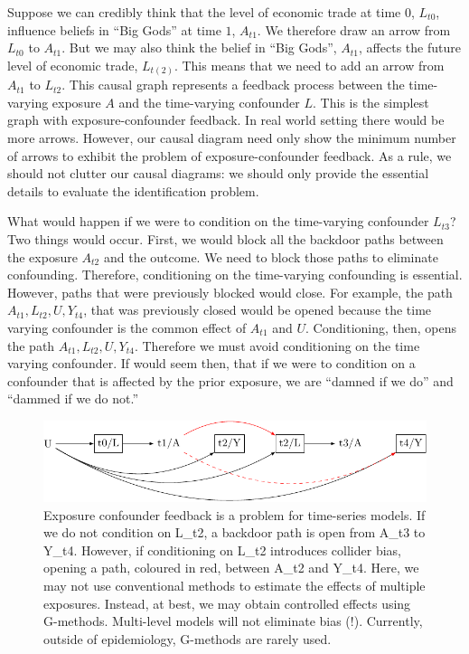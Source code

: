 \documentclass[
  singlecolumn]{report}
\begin{document}
Suppose we can credibly think that the level of economic trade at time
\(0\), \(L_{t0}\), influence beliefs in ``Big Gods'' at time \(1\),
\(A_{t1}\). We therefore draw an arrow from \(L_{t0}\) to \(A_{t1}\).
But we may also think the belief in ``Big Gods'', \(A_{t1}\), affects
the future level of economic trade, \(L_{t(2)}\). This means that we
need to add an arrow from \(A_{t1}\) to \(L_{t2}\). This causal graph
represents a feedback process between the time-varying exposure \(A\)
and the time-varying confounder \(L\). This is the simplest graph with
exposure-confounder feedback. In real world setting there would be more
arrows. However, our causal diagram need only show the minimum number of
arrows to exhibit the problem of exposure-confounder feedback. As a
rule, we should not clutter our causal diagrams: we should only provide
the essential details to evaluate the identification problem.

What would happen if we were to condition on the time-varying confounder
\(L_{t3}\)? Two things would occur. First, we would block all the
backdoor paths between the exposure \(A_{t2}\) and the outcome. We need
to block those paths to eliminate confounding. Therefore, conditioning
on the time-varying confounding is essential. However, paths that were
previously blocked would close. For example, the path
\(A_{t1}, L_{t2}, U, Y_{t4}\), that was previously closed would be
opened because the time varying confounder is the common effect of
\(A_{t1}\) and \(U\). Conditioning, then, opens the path
\(A_{t1}, L_{t2}, U, Y_{t4}\). Therefore we must avoid conditioning on
the time varying confounder. If would seem then, that if we were to
condition on a confounder that is affected by the prior exposure, we are
``damned if we do'' and ``dammed if we do not.''

\begin{figure}

{\centering \includegraphics[width=1\textwidth,height=\textheight]{causal-dags_files/figure-pdf/fig-dag-9-1.pdf}

}

\caption{\label{fig-dag-9}Exposure confounder feedback is a problem for
time-series models. If we do not condition on L\_t2, a backdoor path is
open from A\_t3 to Y\_t4. However, if conditioning on L\_t2 introduces
collider bias, opening a path, coloured in red, between A\_t2 and Y\_t4.
Here, we may not use conventional methods to estimate the effects of
multiple exposures. Instead, at best, we may obtain controlled effects
using G-methods. Multi-level models will not eliminate bias (!).
Currently, outside of epidemiology, G-methods are rarely used.}

\end{figure}
\end{document}
